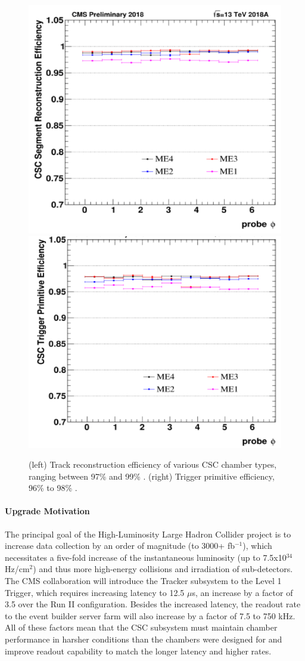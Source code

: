 \documentclass[a4paper,11pt]{article}
\begin{document}
\begin{figure}[htbp]
\centering %
\includegraphics[width=.45\textwidth]{TrackEfficiency.png}
\qquad
\includegraphics[width=.45\textwidth]{TriggerEfficiency.png}
\caption{\label{fig:runIIefficiency} (left) Track reconstruction efficiency of various CSC chamber types, ranging between 97\% and 99\% \cite{highlights}. (right) Trigger primitive efficiency, 96\% to 98\% \cite{highlights}.}
\end{figure}

\paragraph{Upgrade Motivation}
The principal goal of the High-Luminosity Large Hadron Collider project is to increase data collection by an order of magnitude (to 3000+ fb$^{-1}$), which necessitates a five-fold increase of the instantaneous luminosity (up to 7.5x10$^{34}$ Hz/cm$^2$) and thus more high-energy collisions and irradiation of sub-detectors.
The CMS collaboration will introduce the  Tracker subsystem to the Level 1 Trigger, which requires increasing latency to 12.5 $\mu$s, an increase by a factor of 3.5 over the Run II configuration. Besides the increased latency, the readout rate to the event builder server farm will also increase by a factor of 7.5 to 750 kHz. All of these factors mean that the CSC subsystem must maintain chamber performance in harsher conditions than the chambers were designed for and improve readout capability to match the longer latency and higher rates.
\end{document}
